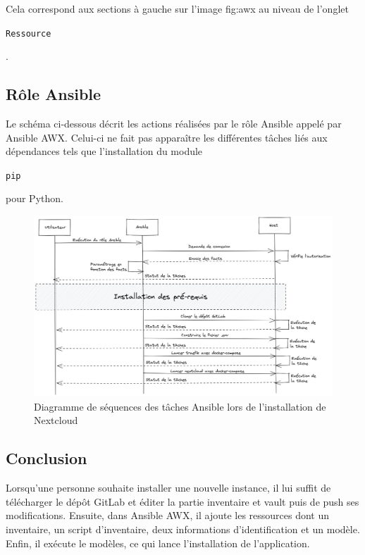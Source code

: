 \documentclass[12pt]{article}
\begin{document}
Cela correspond aux sections à gauche sur l'image \refname{fig:awx} au niveau de l'onglet \begin{code}\texttt{Ressource}\end{code}.

\subsection{Rôle Ansible}
Le schéma ci-dessous décrit les actions réalisées par le rôle \gls{Ansible} appelé par \gls{Ansible} AWX. 
Celui-ci ne fait pas apparaître les différentes tâches liés aux dépendances tels que l'installation du module \begin{code}\texttt{pip}\end{code} pour Python.

\begin{figure}[!ht]
    \centering
    \includegraphics[width=\textwidth]{src/graph_ansible_nextcloud.png}
    \caption{Diagramme de séquences des tâches \gls{Ansible} lors de l'installation de \gls{Nextcloud}}
    \label{fig:nextcloud_ansible}
\end{figure}

\newpage
\subsection{Conclusion}
Lorsqu'une personne souhaite installer une nouvelle instance, il lui suffit de télécharger le dépôt \gls{GitLab} et éditer la partie inventaire et vault puis de push ses modifications. 
Ensuite, dans \gls{Ansible} AWX, il ajoute les ressources dont un inventaire, un script d'inventaire, deux informations d'identification et un modèle. 
Enfin, il exécute le modèles, ce qui lance l'installation de l'application.
\end{document}
